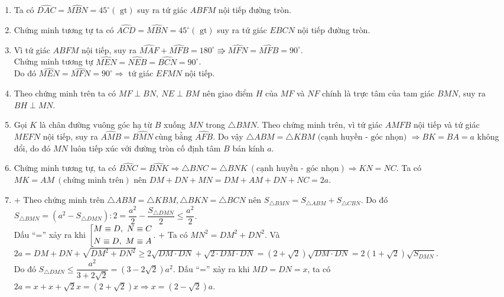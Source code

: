 \begin{bt}
{\begin{center}
\begin{tikzpicture}[line join = round, line cap = round,>=stealth,font=\footnotesize,scale=1]
			\end{tikzpicture}\end{center}
		\begin{enumerate}
			\item Ta có $\widehat{DAC}=\widehat{MBN}=45^\circ(\mbox{ gt})$ suy ra tứ giác $ABFM$ nội tiếp đường tròn.
			\item Chứng minh tương tự ta có $\widehat{ACD}=\widehat{MBN}=45^\circ(\mbox{ gt})$ suy ra tứ giác $EBCN$ nội tiếp đường tròn.
			\item Vì tứ giác $ABFM$ nội tiếp, suy ra $\widehat{MAF}+\widehat{MFB}=180^\circ\Rrightarrow\widehat{MFN}=\widehat{MFB}=90^\circ$.\\
			Chứng minh tương tự $\widehat{MEN}=\widehat{NEB}=\widehat{BCN}=90^\circ$.\\
			Do đó $\widehat{MEN}=\widehat{MFN}=90^\circ\Rightarrow$ tứ giác $EFMN$ nội tiếp.
			\item Theo chứng minh trên ta có $MF\perp BN,\ NE\perp BM$ nên giao điểm $H$ của $MF$ và $NF$ chính là trực tâm của tam giác $BMN$, suy ra $BH\perp MN$.
			\item Gọi $K$ là chân đường vuông góc hạ từ $B$ xuống $MN$ trong $\triangle BMN$. Theo chứng minh trên, vì tứ giác $AMFB$ nội tiếp và tứ giác $MEFN$ nội tiếp, suy ra $\widehat{AMB}=\widehat{BMN}\ \mbox{cùng bằng } \widehat{AFB}$. Do vậy $\triangle ABM=\triangle KBM\mbox{ (cạnh huyền - góc nhọn)}$ $\Rightarrow BK=BA=a$ không đổi, do đó $MN$ luôn tiếp xúc với đường tròn cố định tâm $B$ bán kính $a$.
			\item Chứng minh tương tự, ta có $\widehat{BNC}=\widehat{BNK}\Rightarrow\triangle BNC=\triangle BNK\ (\mbox{cạnh huyền - góc nhọn})\Rightarrow KN=NC$. Ta có $MK=AM\ ( \mbox{chứng minh trên}) $ nên $DM+DN+MN=DM+AM+DN+NC=2a$.
			\item  + Theo chứng minh trên $\triangle ABM=\triangle KBM, \triangle BKN=\triangle BCN$ nên $S_{\triangle BMN}=S_{\triangle ABM}+S_{\triangle CBN}$. Do đó $S_{\triangle BMN}=(a^2-S_{\triangle DMN}):2=\dfrac{a^2}{2}-\dfrac{S_{\triangle DMN}}{2}\le\dfrac{a^2}{2}$. \\ Dấu ``='' xảy ra khi $\hoac{& M\equiv D,\ N\equiv C \\ & N\equiv D,\ M\equiv A}$.
			+ Ta có $MN^2=DM^2+DN^2.$ Và $2a=DM+DN+\sqrt{DM^2+DN^2}\ge2\sqrt{DM\cdot DN}+\sqrt{2\cdot DM\cdot DN}=(2+\sqrt{2})\sqrt{DM\cdot DN}=2(1+\sqrt{2})\sqrt{S_{DMN}}$.\\
			Do đó $S_{\triangle DMN}\le\dfrac{a^2}{3+2\sqrt2}=(3-2\sqrt{2})a^2$.
			Dấu ``='' xảy ra khi $MD=DN=x$, ta có $2a=x+x+\sqrt{2}x=(2+\sqrt{2})x\Rightarrow x=(2-\sqrt{2})a$.
		\end{enumerate}
	}
\end{bt}

